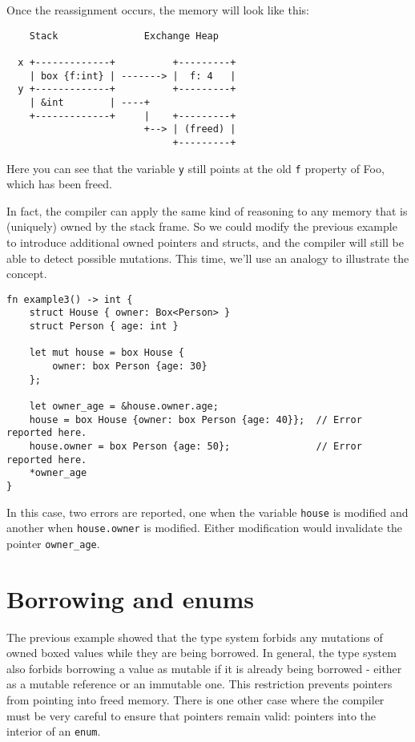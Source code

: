 \documentclass[]{article}
\begin{document}
Once the reassignment occurs, the memory will look like this:

\begin{verbatim}
    Stack               Exchange Heap

  x +-------------+          +---------+
    | box {f:int} | -------> |  f: 4   |
  y +-------------+          +---------+
    | &int        | ----+
    +-------------+     |    +---------+
                        +--> | (freed) |
                             +---------+
\end{verbatim}

Here you can see that the variable \texttt{y} still points at the old
\texttt{f} property of Foo, which has been freed.

In fact, the compiler can apply the same kind of reasoning to any memory
that is (uniquely) owned by the stack frame. So we could modify the
previous example to introduce additional owned pointers and structs, and
the compiler will still be able to detect possible mutations. This time,
we'll use an analogy to illustrate the concept.

\begin{verbatim}
fn example3() -> int {
    struct House { owner: Box<Person> }
    struct Person { age: int }

    let mut house = box House {
        owner: box Person {age: 30}
    };

    let owner_age = &house.owner.age;
    house = box House {owner: box Person {age: 40}};  // Error reported here.
    house.owner = box Person {age: 50};               // Error reported here.
    *owner_age
}
\end{verbatim}

In this case, two errors are reported, one when the variable
\texttt{house} is modified and another when \texttt{house.owner} is
modified. Either modification would invalidate the pointer
\texttt{owner\_age}.

\section{Borrowing and enums}\label{borrowing-and-enums}

The previous example showed that the type system forbids any mutations
of owned boxed values while they are being borrowed. In general, the
type system also forbids borrowing a value as mutable if it is already
being borrowed - either as a mutable reference or an immutable one. This
restriction prevents pointers from pointing into freed memory. There is
one other case where the compiler must be very careful to ensure that
pointers remain valid: pointers into the interior of an \texttt{enum}.
\end{document}

